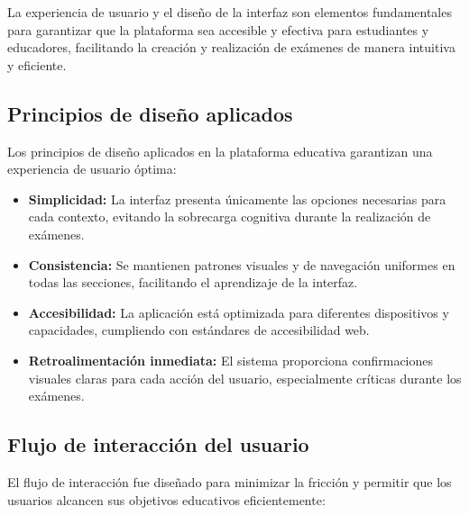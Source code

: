 \documentclass[12pt,a4paper]{report}
\begin{document}
La experiencia de usuario y el diseño de la interfaz son elementos fundamentales para garantizar que la plataforma sea accesible y efectiva para estudiantes y educadores, facilitando la creación y realización de exámenes de manera intuitiva y eficiente.

\subsection{Principios de diseño aplicados}

Los principios de diseño aplicados en la plataforma educativa garantizan una experiencia de usuario óptima:

\begin{itemize}
\item \textbf{Simplicidad:} La interfaz presenta únicamente las opciones necesarias para cada contexto, evitando la sobrecarga cognitiva durante la realización de exámenes.

\item \textbf{Consistencia:} Se mantienen patrones visuales y de navegación uniformes en todas las secciones, facilitando el aprendizaje de la interfaz.

\item \textbf{Accesibilidad:} La aplicación está optimizada para diferentes dispositivos y capacidades, cumpliendo con estándares de accesibilidad web.

\item \textbf{Retroalimentación inmediata:} El sistema proporciona confirmaciones visuales claras para cada acción del usuario, especialmente críticas durante los exámenes.
\end{itemize}

\subsection{Flujo de interacción del usuario}

El flujo de interacción fue diseñado para minimizar la fricción y permitir que los usuarios alcancen sus objetivos educativos eficientemente:
\end{document}
